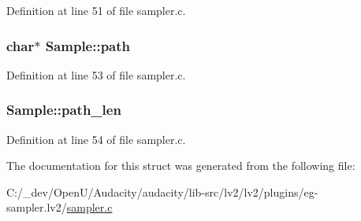 Definition at line 51 of file sampler.\+c.

\subsubsection[{\texorpdfstring{path}{path}}]{\setlength{\rightskip}{0pt plus 5cm}char$\ast$ Sample\+::path}\hypertarget{struct_sample_aa4d619cb7a01ae619375eddd139b924a}{}\label{struct_sample_aa4d619cb7a01ae619375eddd139b924a}


Definition at line 53 of file sampler.\+c.

\subsubsection[{\texorpdfstring{path\+\_\+len}{path_len}}]{ Sample\+::path\+\_\+len}\hypertarget{struct_sample_a667e56ed4c7c1505a58b7d5c5b140e76}{}\label{struct_sample_a667e56ed4c7c1505a58b7d5c5b140e76}


Definition at line 54 of file sampler.\+c.



The documentation for this struct was generated from the following file\+:\begin{DoxyCompactItemize}
\item 
C\+:/\+\_\+dev/\+Open\+U/\+Audacity/audacity/lib-\/src/lv2/lv2/plugins/eg-\/sampler.\+lv2/\hyperlink{lv2_2lv2_2plugins_2eg-sampler_8lv2_2sampler_8c}{sampler.\+c}\end{DoxyCompactItemize}
